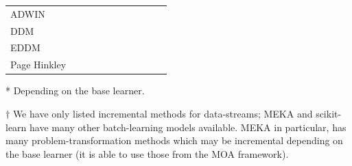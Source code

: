 \documentclass[twoside,11pt]{article}
\newcommand{\sklearn}{\textsf{scikit-learn}\xspace}
\newcommand{\moa}{\textsf{MOA}\xspace}
\newcommand{\meka}{\textsf{MEKA}\xspace}
\newcommand{\cmark}{\ding{51}}  %
\begin{document}
\begin{table}[!b]
\begin{threeparttable}[t]
\begin{tabular}{@{}lccccc|ccccc@{}}
    ADWIN                   &                                         &                                     &                                        &                                       & \cmark                                   & \cmark                        &                                                 &                                                    & \cmark                                     & \cite{Bifet-et-al-2018} \\
    DDM                     &                                         &                                     &                                        &                                       & \cmark                                   & \cmark                        &                                                 &                                                    & \cmark                                     & \cite{Gama2004}  \\
    EDDM                    &                                         &                                     &                                        &                                       & \cmark                                   & \cmark                        &                                                 &                                                    & \cmark                                     & \cite{Bifet-et-al-2018}  \\
    Page Hinkley            &                                         &                                     &                                        &                                       & \cmark                                   & \cmark                        &                                                 &                                                    & \cmark                                     & \cite{Page1954} \\
    \bottomrule
    \end{tabular}
    \begin{tablenotes}
     \item[*] Depending on the base learner.
     \item[$\dagger$] We have only listed incremental methods for data-streams; \meka and \sklearn have many other batch-learning models available. \meka in particular, has many problem-transformation methods which may be incremental depending on the base learner (it is able to use those from the \moa framework).
   \end{tablenotes}
    \end{threeparttable}
\end{table}
\end{document}
